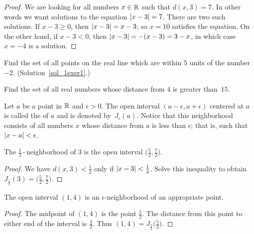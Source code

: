 \begin{proof} We are looking for all numbers $x \in \mathbb{R}$ such that $d(x,3)=7$. In other words
we want solutions to the equation $\lvert x-3\rvert=7$.  There are two such solutions.  If $x-3 \ge
0$, then $\lvert x-3\rvert = x-3$; so $x=10$ satisfies the equation.  On the other hand, if $x-3 <
0$, then $\lvert x-3\rvert = -(x-3) = 3-x$, in which case $x=-4$ is a solution.
\end{proof}


\begin{exer}\label{1exer1} Find the set of all points on the real line which are within $5$
units of the number~$-2$. (Solution~\ref{sol_1exer1}.)
\end{exer}

\begin{prob} Find the set of all real numbers whose distance from $4$ is greater than~$15$.
\end{prob}

\begin{defn} Let $a$ be a point in $\mathbb{R}$ and $\epsilon > 0$.  The open interval
$(a - \epsilon, a + \epsilon)$ centered at $a$ is called the
 of $a$ and is denoted
by~$J_\epsilon(a)$.  Notice that this neighborhood consists of all
numbers $x$ whose distance from $a$ is less than $\epsilon$; that
is, such that $\lvert x-a\rvert<\epsilon$.
\end{defn}

\begin{exam} The $\frac12$\,-\,neighborhood of $3$ is the open interval
$\bigl(\frac52,\frac72\bigr)$.
\end{exam}

\begin{proof} We have $d(x,3) < \frac12$ only if $\lvert x-3\rvert < \frac12$.  Solve this
inequality to obtain $J_\frac12(3) = \bigl(\frac52,\frac72\bigr)$.
\end{proof}

\begin{exam} The open interval $(1,4)$ is an $\epsilon$-neighborhood of an appropriate point.
\end{exam}

\begin{proof} The midpoint of $(1,4)$ is the point $\frac52$.  The distance from this point to
either end of the interval is $\frac32$. Thus $(1,4) = J_\frac32\bigl(\frac52\bigr)$.
\end{proof}

